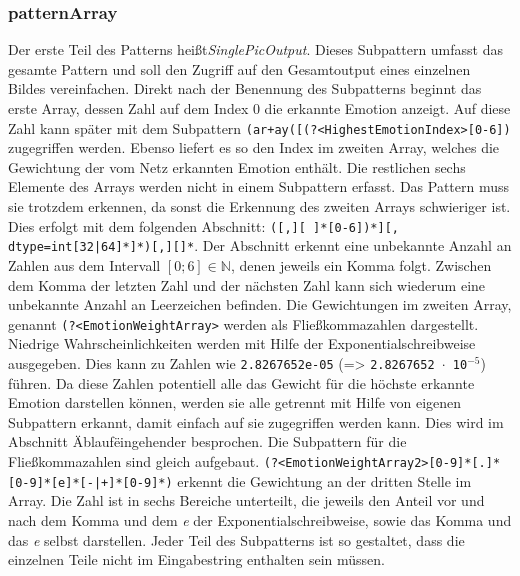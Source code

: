 \documentclass[10pt,a4paper]{report}
\begin{document}
\subsubsection{patternArray}
Der erste Teil des Patterns hei{\ss}t\textit{SinglePicOutput}. Dieses Subpattern umfasst das gesamte Pattern und soll den 
Zugriff auf den Gesamtoutput eines einzelnen Bildes vereinfachen. Direkt nach der Benennung des Subpatterns beginnt 
das erste Array, dessen Zahl auf dem Index 0 die erkannte Emotion anzeigt. Auf diese Zahl kann sp\"{a}ter mit dem Subpattern 
\texttt{(ar+ay([(?<HighestEmotionIndex>[0-6])} zugegriffen werden.  Ebenso liefert es so den Index im zweiten Array, 
welches die Gewichtung der vom Netz erkannten Emotion enth\"{a}lt. Die restlichen sechs Elemente des Arrays werden nicht in 
einem Subpattern erfasst. Das Pattern muss sie trotzdem erkennen, da  sonst die Erkennung des zweiten Arrays 
schwieriger ist. Dies erfolgt mit dem folgenden Abschnitt: \texttt{([,][ ]*[0-6])*][, dtype=int[32|64]*]*)[,][]*}. Der Abschnitt 
erkennt eine unbekannte Anzahl an Zahlen aus dem Intervall $\left[0;6\right] \in \mathbb{N}$, denen jeweils ein Komma 
folgt. Zwischen dem Komma der letzten Zahl und der n\"{a}chsten Zahl kann sich wiederum eine unbekannte Anzahl an 
Leerzeichen befinden.
Die Gewichtungen im zweiten Array, genannt \texttt{(?<EmotionWeightArray>} werden als Flie{\ss}kommazahlen 
dargestellt. Niedrige Wahrscheinlichkeiten werden mit Hilfe der Exponentialschreibweise ausgegeben. Dies kann zu Zahlen 
wie \texttt{2.8267652e-05} (=> \texttt{2.8267652 $\cdot$ 10$^{-5}$}) f\"{u}hren. Da diese Zahlen potentiell alle das Gewicht 
f\"{u}r die h\"{o}chste erkannte Emotion darstellen k\"{o}nnen, werden sie alle getrennt mit Hilfe von eigenen Subpattern erkannt, 
damit einfach auf sie zugegriffen werden kann. Dies wird im Abschnitt \"Ablauf\" eingehender besprochen. Die Subpattern 
f\"{u}r die Flie{\ss}kommazahlen sind gleich aufgebaut. \texttt{(?<EmotionWeightArray2>[0-9]*[.]*[0-9]*[e]*[-|+]*[0-9]*)} 
erkennt die Gewichtung an der dritten Stelle im Array. Die Zahl ist in sechs Bereiche unterteilt, die jeweils den Anteil vor und  
nach dem Komma und dem \textit{e} der Exponentialschreibweise, sowie das Komma und das  \textit{e} selbst darstellen. 
Jeder Teil des Subpatterns ist so gestaltet, dass die einzelnen Teile nicht im Eingabestring enthalten sein m\"{u}ssen.
\end{document}
